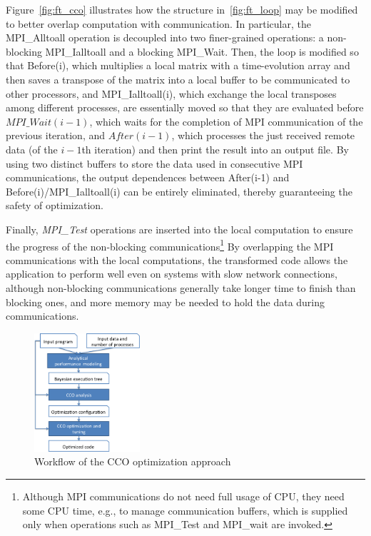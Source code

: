 Figure~\ref{fig:ft_cco} illustrates how the structure in~\ref{fig:ft_loop} may be modified to better overlap computation with communication.
In particular,
   the MPI\_Alltoall operation is decoupled into two finer-grained operations: a non-blocking MPI\_Ialltoall and a blocking MPI\_Wait.
Then, the loop is modified so that Before(i), which multiplies a local matrix with a time-evolution array and then saves a transpose of the matrix into a local buffer to be communicated to other processors,  and MPI\_Ialltoall(i),  which exchange the local transposes among different processes, 
 are essentially moved so that they are evaluated before $MPI\_Wait(i-1)$, which waits for the completion of MPI communication of the previous iteration, and $After(i-1)$, which processes the just received remote data (of the $i-1$th iteration) and then print the result into an output file. 
By using two distinct buffers to store the data used in consecutive MPI communications,  the output dependences between After(i-1) and Before(i)/MPI\_Ialltoall(i) can be
entirely eliminated, thereby guaranteeing the safety of optimization.

Finally,
   \emph{MPI\_Test} operations are inserted into the local computation to ensure the progress of the non-blocking communications\footnote{
  Although MPI communications do not need full usage of CPU, they need some CPU time,
 e.g., to manage communication buffers,
which is supplied only when operations such as MPI\_Test and MPI\_wait are invoked.}
By overlapping the MPI communications with the local computations, the transformed code
allows the application to perform well even on systems with slow network connections, although
non-blocking communications generally take longer time to finish than blocking ones,
and more memory may be needed to hold the data during communications.

\begin{figure}[h]
\centering
\includegraphics[width=0.35\textwidth]{fig/framework.png} %
\caption{Workflow of the CCO optimization approach}
\label{fig:overview}
\end{figure}


